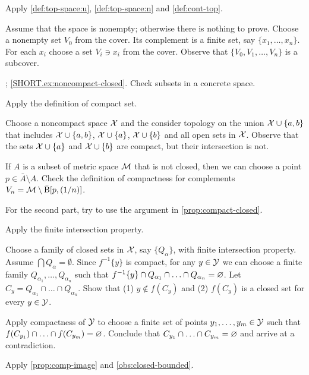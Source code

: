 Apply \ref{def:top-space:u}, \ref{def:top-space:n} and \ref{def:cont-top}.

Assume that the space is nonempty; otherwise there is nothing to prove.
Choose a nonempty set $V_0$ from the cover.
Its complement is a finite set, say $\{x_1,\ldots,x_n\}$.
For each $x_i$ choose a set $V_i\ni x_i$ from the cover.
Observe that $\{V_0,V_1,\ldots,V_n\}$ is a subcover.



\parbf{\ref{ex:noncompact-un}}; \ref{SHORT.ex:noncompact-closed}.
Check subsets in a concrete space.

 Apply the definition of compact set.

Choose a noncompact space $\mathcal{X}$ and the consider topology on the union $\mathcal{X}\cup\{a,b\}$ that includes
$\mathcal{X}\cup\{a,b\}$, $\mathcal{X}\cup\{a\}$, $\mathcal{X}\cup\{b\}$ and all open sets in $\mathcal{X}$.
Observe that the sets $\mathcal{X}\cup\{a\}$ and $\mathcal{X}\cup\{b\}$ are compact, but their intersection is not.

 If $A$ is a subset of metric space $\mathcal{M}$ that is not closed, then we can choose a point $p\in \bar A\setminus A$.
Check the definition of compactness for complements $V_n=\mathcal{M}\setminus \bar{\mathrm{B}}[p,(1/n)]$.

For the second part, try to use the argument in \ref{prop:compact-closed}.

 Apply the finite intersection property.

Choose a family of closed sets in $\mathcal{X}$, say $\{Q_\alpha\}$, with finite intersection property.
Assume $\bigcap Q_\alpha=\emptyset$.
Since $f^{-1}\{y\}$ is compact, for any $y\in \mathcal{Y}$ we can choose a finite family $Q_{\alpha_1},\ldots, Q_{\alpha_n}$ such that $f^{-1}\{y\}\cap Q_{\alpha_1}\cap\z\ldots\cap Q_{\alpha_n}=\emptyset$.
Let $C_y=Q_{\alpha_1}\cap\ldots\cap Q_{\alpha_n}$.
Show that (1) $y\notin f(C_y)$ and (2) $f(C_y)$ is a closed set for every $y\in \mathcal{Y}$.

Apply compactness of $\mathcal{Y}$ to choose a finite set of points $y_1,\z\ldots,y_m\in \c{Y}$ such that $f(C_{y_1})\cap \z\ldots \cap f(C_{y_m})=\emptyset$.
Conclude that $C_{y_1}\cap \z\ldots \cap C_{y_m}=\emptyset$ and arrive at a contradiction.


Apply \ref{prop:comp-image} and \ref{obs:closed-bounded}.

